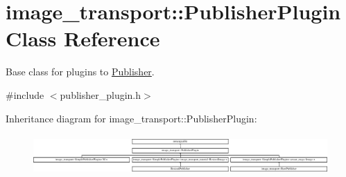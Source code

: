 \hypertarget{classimage__transport_1_1_publisher_plugin}{\section{image\-\_\-transport\-:\-:Publisher\-Plugin Class Reference}
\label{classimage__transport_1_1_publisher_plugin}
}


Base class for plugins to \hyperlink{classimage__transport_1_1_publisher}{Publisher}.  




{\ttfamily \#include $<$publisher\-\_\-plugin.\-h$>$}

Inheritance diagram for image\-\_\-transport\-:\-:Publisher\-Plugin\-:\begin{figure}[H]
\begin{center}
\leavevmode
\includegraphics[height=1.545894cm]{classimage__transport_1_1_publisher_plugin}
\end{center}
\end{figure}
